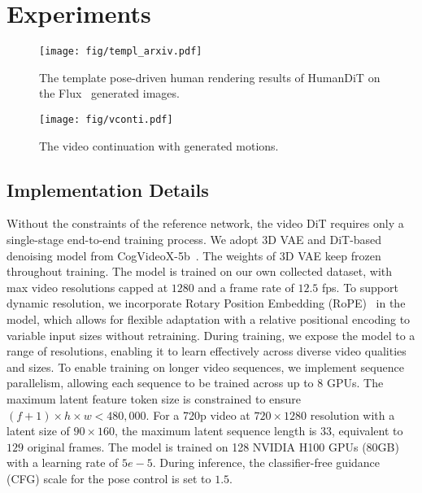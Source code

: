 

\section{Experiments}
\label{sec:exp}

\begin{figure*}[htp]
    \centering
    \texttt{[image: fig/templ\_arxiv.pdf]}
    \vspace{-0.25in}
    \caption{The template pose-driven human rendering results of HumanDiT on the Flux~\cite{flux} generated images.}
    \vspace{-0.2in}
    \label{fig:templ}
\end{figure*}

\begin{figure}[htp]
    \centering
    \texttt{[image: fig/vconti.pdf]}
    \vspace{-0.25in}
    \caption{The video continuation with generated motions.}
    \vspace{-0.15in}
    \label{fig:gene}
\end{figure} %

\subsection{Implementation Details}

Without the constraints of the reference network, the video DiT requires only a single-stage end-to-end training process. We adopt 3D VAE and DiT-based denoising model from CogVideoX-5b~\cite{yang2024cogvideox}. The weights of 3D VAE keep frozen throughout training. The model is trained on our own collected dataset, with max video resolutions capped at $1280$ and a frame rate of $12.5$ fps. To support dynamic resolution, we incorporate Rotary Position Embedding (RoPE)~\cite{su2024roformer} in the model, which allows for flexible adaptation with a relative positional
encoding to variable input sizes without retraining. During training, we expose the model to a range of resolutions, enabling it to learn effectively across diverse video qualities and sizes. To enable training on longer video sequences, we implement sequence parallelism, allowing each sequence to be trained across up to 8 GPUs. The maximum latent feature token size is constrained to ensure $(f+1)\times h\times w<480,000$. For a 720p video at $720\times1280$ resolution with a latent size of $90\times160$, the maximum latent sequence length is $33$, equivalent to $129$ original frames. The model is trained on 128 NVIDIA H100 GPUs (80GB) with a learning rate of $5e-5$. During inference, the classifier-free guidance (CFG) scale for the pose control is set to $1.5$.

